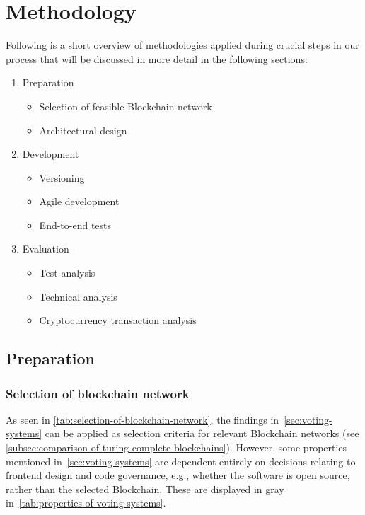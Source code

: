 \chapter{Methodology}\label{ch:methodology}

Following is a short overview of methodologies applied during crucial steps in our process that will be discussed in more detail in the following sections:

\begin{enumerate}
    \item Preparation
    \begin{itemize}
        \item Selection of feasible \gls{Blockchain} network
        \item Architectural design
    \end{itemize}
    \item Development
    \begin{itemize}
        \item Versioning
        \item Agile development
        \item End-to-end tests
    \end{itemize}
    \item Evaluation
    \begin{itemize}
        \item Test analysis
        \item Technical analysis
        \item Cryptocurrency transaction analysis
    \end{itemize}
\end{enumerate}

\section{Preparation}\label{sec:preparation}

\subsection{Selection of blockchain network}\label{subsec:selection-of-blockchain-network}

As seen in \cref{tab:selection-of-blockchain-network}, the findings in~\cref{sec:voting-systems} can be applied as selection criteria for relevant \gls{Blockchain} networks (see \cref{subsec:comparison-of-turing-complete-blockchains}).
However, some properties mentioned in~\cref{sec:voting-systems} are dependent entirely on decisions relating to frontend design and code governance, e.g., whether the software is open source, rather than the selected \gls{Blockchain}.
These are displayed in gray in~\cref{tab:properties-of-voting-systems}.

